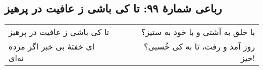 \begin{center}
\section*{رباعی شمارهٔ ۹۹: تا کی باشی ز عافیت در پرهیز}
\label{sec:099}
\begin{longtable}{l p{0.5cm} r}
تا کی باشی ز عافیت در پرهیز
&&
با خلق به آشتی و با خود به ستیز؟
\\
ای خفتهٔ بی خبر اگر مرده نه‌ای
&&
روز آمد و رفت، تا به کی خُسبی؟ خیز!
\\
\end{longtable}
\end{center}
